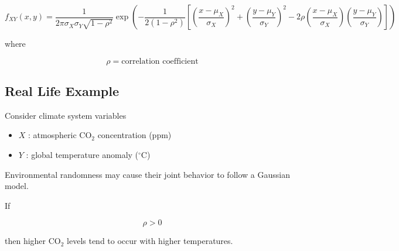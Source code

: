 \documentclass[12pt]{article}
\begin{document}
\[
f_{XY}(x,y)=
\frac{1}{2\pi\sigma_X\sigma_Y\sqrt{1-\rho^2}}
\exp
\left(
-\frac{1}{2(1-\rho^2)}
\left[
\left(\frac{x-\mu_X}{\sigma_X}\right)^2
+
\left(\frac{y-\mu_Y}{\sigma_Y}\right)^2
-
2\rho
\left(\frac{x-\mu_X}{\sigma_X}\right)
\left(\frac{y-\mu_Y}{\sigma_Y}\right)
\right]
\right)
\]

where

\[
\rho = \text{correlation coefficient}
\]

\subsection*{Real Life Example}

Consider climate system variables

\begin{itemize}
\item $X$ : atmospheric CO$_2$ concentration (ppm)
\item $Y$ : global temperature anomaly ($^\circ$C)
\end{itemize}

Environmental randomness may cause their joint behavior to follow a Gaussian model.

If

\[
\rho>0
\]

then higher CO$_2$ levels tend to occur with higher temperatures.
\end{document}
